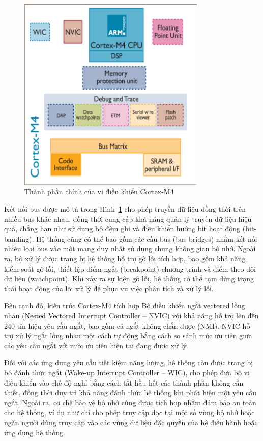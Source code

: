\begin{figure}[!ht]
		\centering
 		\includegraphics[width=0.8\textwidth]{images/cortexM4.png}
		\caption{Thành phần chính của vi điều khiển Cortex-M4}
		\label{cortexM4}
\end{figure}

Kết nối bus được mô tả trong Hình~\ref{cortexM4} cho phép truyền dữ liệu đồng thời trên nhiều bus khác nhau, đồng thời cung cấp khả năng quản lý truyền dữ liệu hiệu quả, chẳng hạn như sử dụng bộ đệm ghi và điều khiển hướng bit hoạt động (bit-banding). Hệ thống cũng có thể bao gồm các cầu bus (bus bridges) nhằm kết nối nhiều loại bus vào một mạng duy nhất sử dụng chung không gian bộ nhớ. Ngoài ra, bộ xử lý được trang bị hệ thống hỗ trợ gỡ lỗi tích hợp, bao gồm khả năng kiểm soát gỡ lỗi, thiết lập điểm ngắt (breakpoint) chương trình và điểm theo dõi dữ liệu (watchpoint). Khi xảy ra sự kiện gỡ lỗi, hệ thống có thể tạm dừng trạng thái hoạt động của lõi xử lý để phục vụ việc phân tích và xử lý lỗi.

Bên cạnh đó, kiến trúc Cortex-M4 tích hợp Bộ điều khiển ngắt vectored lồng nhau (Nested Vectored Interrupt Controller – NVIC) với khả năng hỗ trợ lên đến 240 tín hiệu yêu cầu ngắt, bao gồm cả ngắt không chắn được (NMI). NVIC hỗ trợ xử lý ngắt lồng nhau một cách tự động bằng cách so sánh mức ưu tiên giữa các yêu cầu ngắt với mức ưu tiên hiện tại đang được xử lý.

Đối với các ứng dụng yêu cầu tiết kiệm năng lượng, hệ thống còn được trang bị bộ đánh thức ngắt (Wake-up Interrupt Controller – WIC), cho phép đưa bộ vi điều khiển vào chế độ nghỉ bằng cách tắt hầu hết các thành phần không cần thiết, đồng thời duy trì khả năng đánh thức hệ thống khi phát hiện một yêu cầu ngắt. Ngoài ra, cơ chế bảo vệ bộ nhớ cũng được tích hợp nhằm đảm bảo an toàn cho hệ thống, ví dụ như chỉ cho phép truy cập đọc tại một số vùng bộ nhớ hoặc ngăn người dùng truy cập vào các vùng dữ liệu đặc quyền của hệ điều hành hoặc ứng dụng hệ thống.


